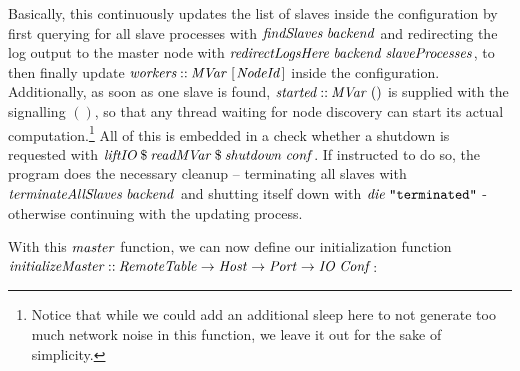 \documentclass[paper=A4,twoside=true,openright,parskip=full,chapterprefix=true,headings=normal,bibliography=totoc,listof=totoc,titlepage=on,captions=tableabove,draft=false,british]{scrreprt}%
\begin{document}
\vspace{-2\baselineskip}

Basically, this continuously updates the list of slaves inside the
configuration by first querying for all slave processes with
\ensuremath{\Varid{findSlaves}\;\Varid{backend}} and redirecting the log output to the master node
with \ensuremath{\Varid{redirectLogsHere}\;\Varid{backend}\;\Varid{slaveProcesses}}, to then finally update
\ensuremath{\Varid{workers}\mathbin{::}\Conid{MVar}\;[\mskip1.5mu \Conid{NodeId}\mskip1.5mu]} inside the configuration. Additionally, as
soon as one slave is found, \ensuremath{\Varid{started}\mathbin{::}\Conid{MVar}\;()} is supplied with the
signalling \ensuremath{()}, so that any thread waiting for node discovery can start
its actual computation.\footnote{Notice that while we could add an
  additional sleep here to not generate too much network noise in this
  function, we leave it out for the sake of simplicity.} All of this is
embedded in a check whether a shutdown is requested with
\ensuremath{\Varid{liftIO}\mathbin{\$}\Varid{readMVar}\mathbin{\$}\Varid{shutdown}\;\Varid{conf}}. If instructed to do so, the program
does the necessary cleanup -- terminating all slaves with
\ensuremath{\Varid{terminateAllSlaves}\;\Varid{backend}} and shutting itself down with
\ensuremath{\Varid{die}\;\text{\tt \char34 terminated\char34}} - otherwise continuing with the updating process.

With this \ensuremath{\Varid{master}} function, we can now define our initialization
function \linebreak \ensuremath{\Varid{initializeMaster}\mathbin{::}\Conid{RemoteTable}\to \Conid{Host}\to \Conid{Port}\to \Conid{IO}\;\Conid{Conf}}:
\end{document}
